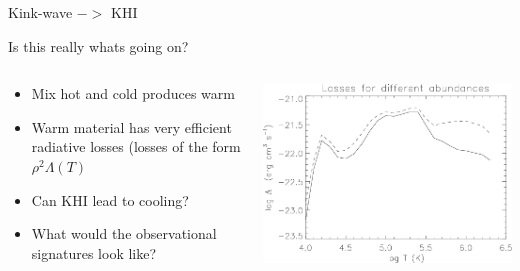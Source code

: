 \documentclass[10pt,aspectratio=169,usenames,dvipsnames]{beamer}
\begin{document}
\begin{frame}{Kink-wave $->$ KHI}
\end{frame}


\begin{frame}{Is this really whats going on?}
\begin{columns}
\begin{column}{0.4\textwidth}
\begin{itemize}
    \item Mix hot and cold produces warm 
    \item Warm material has very efficient radiative losses (losses of the form $\rho^2 \Lambda(T)$
    \item Can KHI lead to cooling?
    \item What would the observational signatures look like?
\end{itemize}
\end{column}
\begin{column}{0.6\textwidth}
\includegraphics[width=0.95\linewidth]{2023Dundee/Figures/loss.png} \\
\end{column}
\end{columns}
\end{frame}
\end{document}

